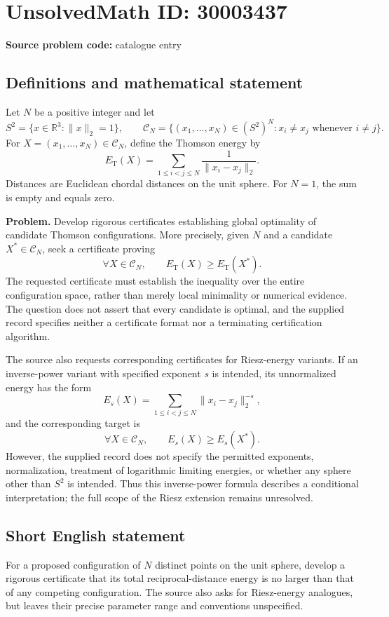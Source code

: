 \documentclass[11pt]{article}
\newcommand{\R}{\mathbb{R}}
\begin{document}
\section*{UnsolvedMath ID: 30003437}
\textbf{Source problem code:} catalogue entry
\subsection{Definitions and mathematical statement}
Let \(N\) be a positive integer and let
\[
S^2=\{x\in\R^3:\lVert x\rVert_2=1\},\qquad
\mathcal C_N=\{(x_1,\ldots,x_N)\in(S^2)^N:x_i\ne x_j\text{ whenever }i\ne j\}.
\]
For \(X=(x_1,\ldots,x_N)\in\mathcal C_N\), define the Thomson energy by
\[
E_{\mathrm T}(X)=\sum_{1\le i<j\le N}\frac{1}{\lVert x_i-x_j\rVert_2}.
\]
Distances are Euclidean chordal distances on the unit sphere. For \(N=1\), the sum is empty and equals zero.

\textbf{Problem.} Develop rigorous certificates establishing global optimality of candidate Thomson configurations. More precisely, given \(N\) and a candidate \(X^*\in\mathcal C_N\), seek a certificate proving
\[
\forall X\in\mathcal C_N,\qquad E_{\mathrm T}(X)\ge E_{\mathrm T}(X^*).
\]
The requested certificate must establish the inequality over the entire configuration space, rather than merely local minimality or numerical evidence. The question does not assert that every candidate is optimal, and the supplied record specifies neither a certificate format nor a terminating certification algorithm.

The source also requests corresponding certificates for Riesz-energy variants. If an inverse-power variant with specified exponent \(s\) is intended, its unnormalized energy has the form
\[
E_s(X)=\sum_{1\le i<j\le N}\lVert x_i-x_j\rVert_2^{-s},
\]
and the corresponding target is
\[
\forall X\in\mathcal C_N,\qquad E_s(X)\ge E_s(X^*).
\]
However, the supplied record does not specify the permitted exponents, normalization, treatment of logarithmic limiting energies, or whether any sphere other than \(S^2\) is intended. Thus this inverse-power formula describes a conditional interpretation; the full scope of the Riesz extension remains unresolved.
\subsection{Short English statement}
For a proposed configuration of \(N\) distinct points on the unit sphere, develop a rigorous certificate that its total reciprocal-distance energy is no larger than that of any competing configuration. The source also asks for Riesz-energy analogues, but leaves their precise parameter range and conventions unspecified.
\end{document}
